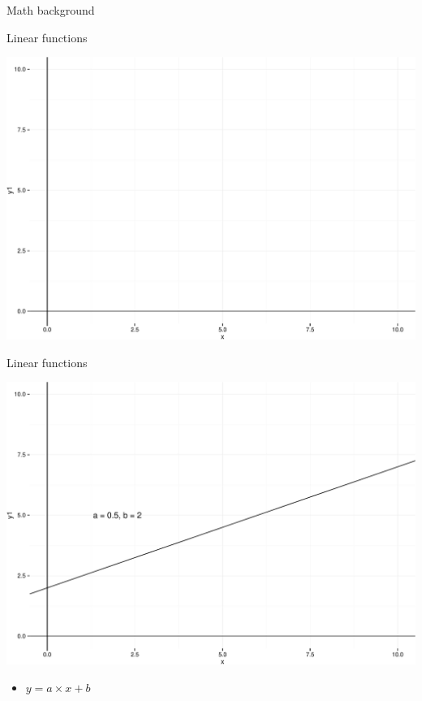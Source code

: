\documentclass[ignorenonframetext,]{beamer}
\begin{document}
\begin{frame}{Math background}

\end{frame}

\begin{frame}{Linear functions}

\includegraphics{Regression_files/figure-beamer/linfun-1.pdf}

\end{frame}

\begin{frame}{Linear functions}

\includegraphics{Regression_files/figure-beamer/unnamed-chunk-1-1.pdf}

\begin{itemize}[<+->]
\itemsep1pt\parskip0pt
\item
  \(y = a \times x + b\)
\end{itemize}

\end{frame}
\end{document}
